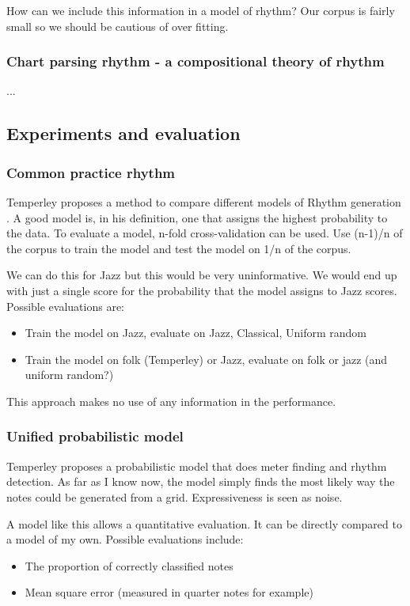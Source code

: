 \documentclass[a4paper,10pt]{article}
\begin{document}
How can we include this information in a model of rhythm? Our corpus is fairly small so we should be cautious of over fitting.

\subsubsection*{Chart parsing rhythm - a compositional theory of rhythm}

...

\subsection{Experiments and evaluation}


\subsubsection*{Common practice rhythm}
Temperley proposes a method to compare different models of Rhythm generation \citep{temperley2010modeling}. A good model is, in his definition, one that assigns the highest probability to the data. To evaluate a model, n-fold cross-validation can be used. Use (n-1)/n of the corpus to train the model and test the model on 1/n of the corpus. 

We can do this for Jazz but this would be very uninformative. We would end up with just a single score for the probability that the model assigns to Jazz scores. Possible evaluations are:
\begin{itemize}
\item Train the model on Jazz, evaluate on Jazz, Classical, Uniform random
\item Train the model on folk (Temperley) or Jazz, evaluate on folk or jazz (and uniform random?)
\end{itemize}

This approach makes no use of any information in the performance. 

\subsubsection*{Unified probabilistic model}
Temperley proposes a probabilistic model that does meter finding and rhythm detection. As far as I know now, the model simply finds the most likely way the notes could be generated from a grid. Expressiveness is seen as noise.

A model like this allows a quantitative evaluation. It can be directly compared to a model of my own. Possible evaluations include:
\begin{itemize}
\item The proportion of correctly classified notes
\item Mean square error (measured in quarter notes for example)
\end{itemize}
\end{document}
